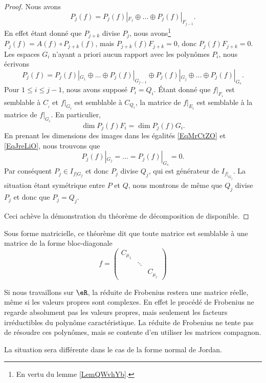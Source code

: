 \begin{proof}
    Nous avons 
    \begin{equation}    \label{EqMrCtZO}
        P_j(f)=P_j(f)|_{F_1}\oplus\ldots\oplus P_j(f)|_{F_{j-1}}.
    \end{equation}
    En effet étant donné que \( P_{j+k}\) divise \( P_j\), nous avons\footnote{En vertu du lemme \ref{LemQWvhYb}.} \( P_{j}(f)=A(f)\circ P_{j+k}(f)\), mais \( P_{j+k}(f)F_{j+k}=0\), donc \( P_j(f)F_{j+k}=0\). Les espaces \( G_i\) n'ayant a priori aucun rapport avec les polynômes \( P_i\), nous écrivons
    \begin{equation}    \label{EqJreLiO}
        P_j(f)=P_j(f)|_{G_1}\oplus\ldots\oplus P_j(f)|_{G_{j-1}}\oplus P_j(f)|_{G_j}\oplus\ldots\oplus P_j(f)|_{G_s}.
    \end{equation}
    Pour \( 1\leq i\leq j-1\), nous avons supposé \( P_i=Q_i\). Étant donné que \( f|_{F_i}\) est semblable à \( C_{_i}\) et \( f|_{G_i}\) est semblable à \( C_{Q_i}\), la matrice de \( f|_{E_i}\) est semblable à la matrice de \( f|_{G_i}\). En particulier,
    \begin{equation}
        \dim P_j(f)F_i=\dim P_j(f)G_i.
    \end{equation}
    En prenant les dimensions des images dans les égalités \eqref{EqMrCtZO} et \eqref{EqJreLiO}, nous trouvons que
    \begin{equation}
        P_j(f)|_{G_j}=\ldots=P_j(f)|_{G_s}=0.
    \end{equation}
    Par conséquent \( P_j\in I_{f|G_j}\) et donc \( P_j\) divise \( Q_j\), qui est générateur de \( I_{f|_{G_j}}\). La situation étant symétrique entre \( P\) et \( Q\), nous montrons de même que \( Q_j\) divise \( P_j\) et donc que \( P_j=Q_j\).

    Ceci achève la démonstration du théorème de décomposition de disponible.

\end{proof}


Sous forme matricielle, ce théorème dit que toute matrice est semblable à une matrice de la forme bloc-diagonale
\begin{equation}
    f=\begin{pmatrix}
        C_{\mu_1}    &       &       \\
            &   \ddots    &       \\
            &       &   C_{\mu_r}
    \end{pmatrix}
\end{equation}

\begin{remark}
    Si nous travaillons sur \( \eR\), la réduite de Frobenius restera une matrice réelle, même si les valeurs propres sont complexes. En effet le procédé de Frobenius ne regarde absolument pas les valeurs propres, mais seulement les facteurs irréductibles du polynôme caractéristique. La réduite de Frobenius ne tente pas de résoudre ces polynômes, mais se contente d'en utiliser les matrices compagnon.

    La situation sera différente dans le cas de la forme normal de Jordan.
\end{remark}

